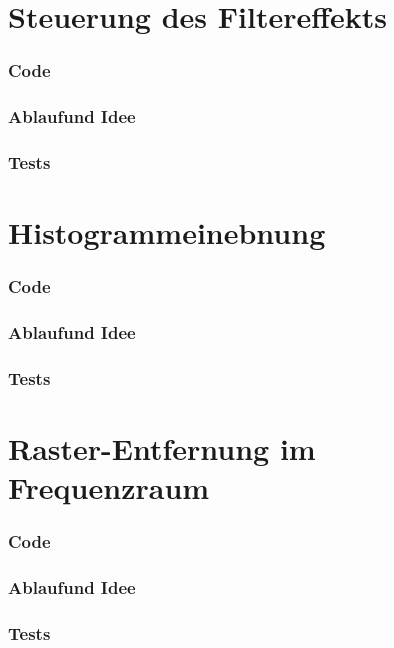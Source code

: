 \documentclass[12pt,german]{article}
\begin{document}
\section{Steuerung des Filtereffekts }
\subsubsection{Code}

\subsubsection{Ablaufund Idee}

\subsubsection{Tests}

\newpage
\section{Histogrammeinebnung  }
\subsubsection{Code}

\subsubsection{Ablaufund Idee}

\subsubsection{Tests}


\newpage
\section{ Raster-Entfernung im Frequenzraum}
\subsubsection{Code}

\subsubsection{Ablaufund Idee}

\subsubsection{Tests}
\end{document}
